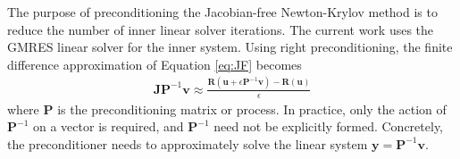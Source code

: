 \documentclass[sn-mathphys,Numbered]{sn-jnl}%
\newcommand{\bb}{\boldsymbol}
\begin{document}

The purpose of preconditioning the Jacobian-free Newton-Krylov method is to reduce the number of inner linear solver iterations.
The current work uses the GMRES linear solver for the inner system.
Using right preconditioning, the finite difference approximation of Equation \ref{eq:JF} becomes
\begin{eqnarray}
	\bb{J} \bb{P}^{-1} \bb{v}
	\approx
	\frac{\bb{R}(\bb{u} + \epsilon \bb{P}^{-1} \bb{v}) - \bb{R}(\bb{u})}{\epsilon}
\end{eqnarray}
where $\bb{P}$ is the preconditioning matrix or process.
In practice, only the action of $\bb{P}^{-1}$ on a vector is required, and $\bb{P}^{-1}$ need not be explicitly formed.
Concretely, the preconditioner needs to approximately solve the linear system $\bb{y} = \bb{P}^{-1} \bb{v}$.
\end{document}
